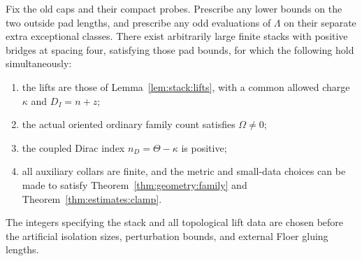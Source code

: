 \begin{theorem}
\label{thm:stack:nonzero}
Fix the old caps and their compact probes.  Prescribe any lower bounds
on the two outside pad lengths, and prescribe any odd evaluations of
\(\Lambda\) on their separate extra exceptional classes.  There
exist arbitrarily large finite stacks with positive bridges at
spacing four, satisfying those pad bounds, for which the following
hold simultaneously:
\begin{enumerate}
\item the lifts are those of Lemma~\ref{lem:stack:lifts}, with a
common allowed charge \(\kappa\) and
\(D_I=n+z\);
\item the actual oriented ordinary family count satisfies
\(\Omega\ne0\);
\item the coupled Dirac index \(n_D=\Theta-\kappa\) is positive;
\item all auxiliary collars are finite, and the metric and small-data
choices can be made to satisfy Theorem~\ref{thm:geometry:family} and
Theorem~\ref{thm:estimates:clamp}.
\end{enumerate}
The integers specifying the stack and all topological lift data are
chosen before the artificial isolation sizes, perturbation bounds,
and external Floer gluing lengths.
\end{theorem}

